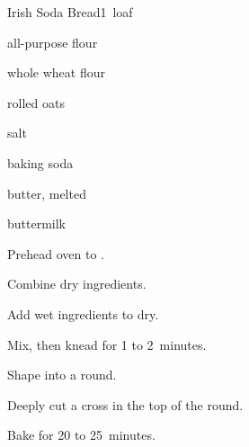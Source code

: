 \begin{recipe}{Irish Soda Bread}{}{1~loaf}

\begin{ingredients}
\item {} all-purpose flour
\item {} whole wheat flour
\item {} rolled oats
\item {} salt
\item {} baking soda
\item {} butter, melted
\item {} buttermilk
\end{ingredients}

\begin{directions}
\item Prehead oven to .
\item Combine dry ingredients.
\item Add wet ingredients to dry.
\item Mix, then knead for 1 to 2~minutes.
\item Shape into a round.
\item Deeply cut a cross in the top of the round.
\item Bake for 20 to 25~minutes.
\end{directions}

\end{recipe}
